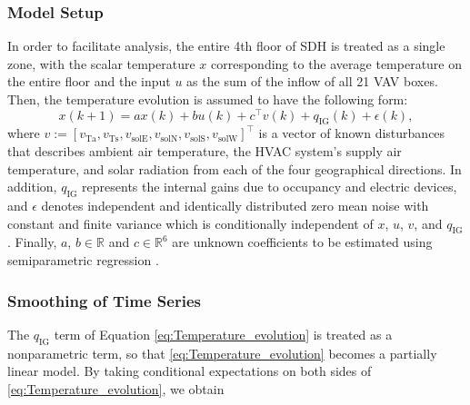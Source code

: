 \subsubsection{Model Setup}
In order to facilitate analysis, the entire 4th floor of SDH is treated as a single zone, with the scalar temperature $x$ corresponding to the %
average temperature on the entire floor and the input $u$ as the sum of the inflow of all 21 VAV boxes. %
Then, the temperature evolution is assumed to have the following form:
\begin{equation}\label{eq:Temperature_evolution}
x(k+1) = a x(k) + b u(k) + c^\top v(k) + q_{\text{IG}}(k) + \epsilon(k),
\end{equation}
where %
$v := \left[v_\text{Ta}, v_\text{Ts}, v_\text{solE}, v_\text{solN}, v_\text{solS}, v_\text{solW} \right]^\top$ is a vector of known disturbances that describes ambient air temperature, the HVAC system's supply air temperature, and solar radiation from each of the four geographical directions.
In addition, $q_{\text{IG}}$ represents the internal gains due to occupancy and electric devices, and $\epsilon$ denotes independent and identically distributed zero mean noise with constant and finite variance which is conditionally independent of $x$, $u$, $v$, and $q_{\text{IG}}$. Finally, $a$, $b \in \mathbb{R}$ and $c \in \mathbb{R}^6$ are unknown coefficients to be estimated using semiparametric regression \cite{Ruppert:2003aa, Hardle:2000aa}.

\subsubsection{Smoothing of Time Series}
The $q_{\text{IG}}$ term of Equation \eqref{eq:Temperature_evolution} is treated as a nonparametric term, so that \eqref{eq:Temperature_evolution} becomes a partially linear model. By taking conditional expectations on both sides of \eqref{eq:Temperature_evolution}, we obtain


